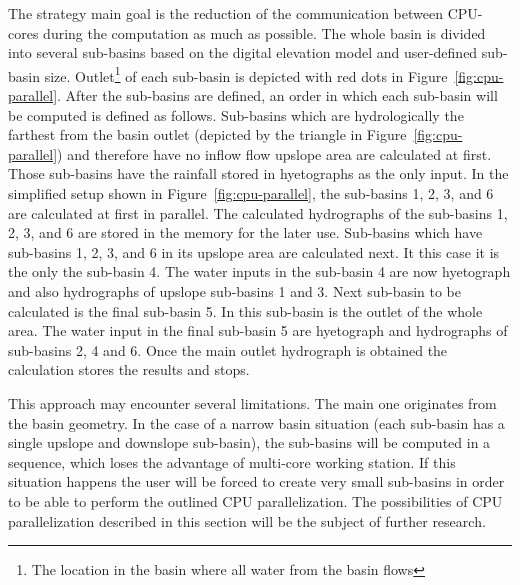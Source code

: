 The strategy main goal is the reduction of
the communication between CPU-cores during the computation as much as
possible. The whole basin is divided into several sub-basins based on
the digital elevation model and user-defined sub-basin size. 
Outlet\footnote{The location in the basin where all water from the basin flows} 
of each sub-basin is depicted with
red dots in Figure~\ref{fig:cpu-parallel}. After the sub-basins
are defined, an order in which each sub-basin will be computed is defined as
follows. Sub-basins which are hydrologically the farthest from the
basin outlet (depicted by the triangle in Figure~\ref{fig:cpu-parallel}) 
and therefore have no inflow flow upslope area are
calculated at first. Those sub-basins have the rainfall stored in
hyetographs as the only input. In the simplified setup shown in
Figure~\ref{fig:cpu-parallel}, the sub-basins 1, 2, 3, and 6 are
calculated at first in parallel. The calculated hydrographs of the
sub-basins 1, 2, 3, and 6 are stored in the memory for the later use. 
Sub-basins which have sub-basins 1, 2, 3, and 6 in its upslope area 
are calculated next. 
It this case it is the only the sub-basin 4. The water inputs in
the sub-basin 4 are now hyetograph and also hydrographs of
upslope sub-basins 1 and 3. 
Next sub-basin to be calculated is the final sub-basin 5. 
In this sub-basin is the outlet of the whole area.
The water input in the final sub-basin 5 are hyetograph and hydrographs 
of sub-basins 2, 4 and 6. Once the main outlet hydrograph is obtained 
the calculation stores the results and stops. 

This approach may encounter several limitations. The main one
originates from the basin geometry. In the case of a narrow basin
situation (each sub-basin has a single upslope and downslope
sub-basin), the sub-basins will be computed in a sequence, which loses
the advantage of multi-core working station. If this situation happens
the user will be forced to create very small sub-basins in order to be
able to perform the outlined CPU parallelization. The possibilities of
CPU parallelization described in this section will be the subject of
further research.

